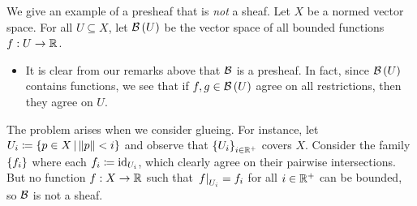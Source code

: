 \documentclass[../Moduli_Spaces_of_Riemann_Surfaces.tex]{subfiles}
\begin{document}
    \vspace{-0.05in}
    \begin{example}
        We give an example of a presheaf that is \textit{not} a sheaf. Let $X$ be a normed vector space. For all $U\subseteq X$, let $\mathcal{B}\left(U\right)$ be the vector space of all bounded functions $f:U\to\mathbb{R}$.
        \begin{itemize}
            \item It is clear from our remarks above that $\mathcal{B}$ is a presheaf. In fact, since $\mathcal{B}\left(U\right)$ contains functions, we see that if $f,g\in\mathcal{B}\left(U\right)$ agree on all restrictions, then they agree on $U$.
        \end{itemize}
        The problem arises when we consider glueing. For instance, let $U_i\coloneqq\left\{p\in X\,\middle\vert\,\left\|p\right\|<i\right\}$ and observe that $\left\{U_i\right\}_{i\in\mathbb{R}^+}$ covers $X$. Consider the family $\left\{f_i\right\}$ where each $f_i\coloneqq\operatorname{id}_{U_i}$, which clearly agree on their pairwise intersections. But no function $f:X\to\mathbb{R}$ such that $\left.f\right|_{U_i}=f_i$ for all $i\in\mathbb{R}^+$ can be bounded, so $\mathcal{B}$ is not a sheaf.\exqed
    \end{example}
\end{document}
